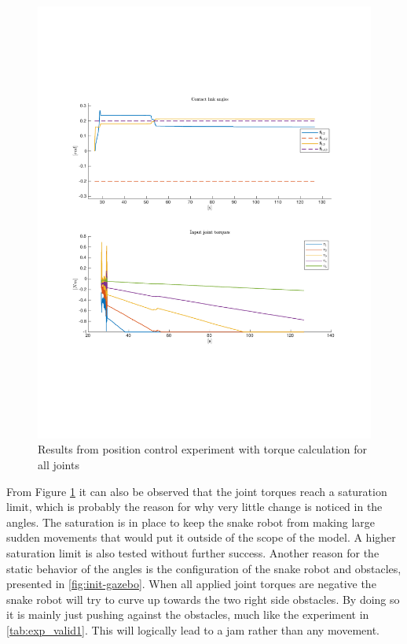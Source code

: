 \begin{figure}[H]
    \centering
    \includegraphics[trim=2.1cm 6cm 2.1cm 5cm, clip=true, width=\textwidth]{figures/experiments/2xpos/2xpos-2plot-fail.pdf}
    \caption{Results from position control experiment with torque calculation for all joints}
    \label{fig:2xp-1}
\end{figure}

From Figure \ref{fig:2xp-1} it can also be observed that the joint torques reach a saturation limit, which is probably the reason for why very little change is noticed in the angles. The saturation is in place to keep the snake robot from making large sudden movements that would put it outside of the scope of the model. A higher saturation limit is also tested without further success. Another reason for the static behavior of the angles is the configuration of the snake robot and obstacles, presented in \ref{fig:init-gazebo}. When all applied joint torques are negative the snake robot will try to curve up towards the two right side obstacles. By doing so it is mainly just pushing against the obstacles, much like the experiment in \ref{tab:exp_valid1}. This will logically lead to a jam rather than any movement.

